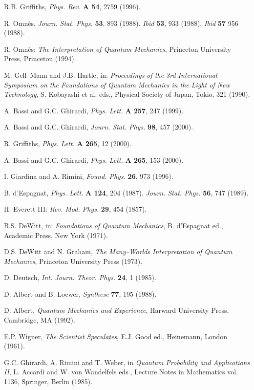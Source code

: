 \documentclass[12pt]{article}
\begin{document}
\begin{thebibliography}{999}
 R.B. Griffiths, {\it Phys. Rev.} {\bf A 54}, 2759
(1996).

 R. Omn\`es, {\it Journ. Stat. Phys.} {\bf 53}, 893
(1988). {\it Ibid} {\bf 53}, 933 (1988). {\it Ibid} {\bf 57} 956
(1988).

 R. Omn\`es: {\it The Interpretation of Quantum
Mechanics}, Princeton University Press, Princeton (1994).

 M. Gell--Mann and J.B. Hartle, in: {\it Proceedings
of the 3rd International Symposium on the Foundations of Quantum
Mechanics in the Light of New Technology}, S. Kobayashi et al.
eds., Physical Society of Japan, Tokio, 321 (1990).

 A. Bassi and G.C. Ghirardi, {\it Phys. Lett.} {\bf A
257}, 247 (1999).

 A. Bassi and G.C. Ghirardi, {\it Journ. Stat. Phys.}
{\bf 98}, 457 (2000).

 R. Griffiths, {\it Phys. Lett.} {\bf A 265}, 12
(2000).

 A. Bassi and G.C. Ghirardi, {\it Phys. Lett.} {\bf
A 265}, 153 (2000).

 I. Giardina and A. Rimini, {\it Found. Phys.}
{\bf 26}, 973 (1996).

 B. d'Espagnat, {\it Phys. Lett.} {\bf A 124}, 204
(1987). {\it Journ. Stat. Phys.} {\bf 56}, 747 (1989).

 H. Everett III: {\it Rev. Mod. Phys.} {\bf 29}, 454
(1857).

 B.S. DeWitt, in: {\it Foundations of Quantum
Mechanics}, B. d'Espagnat ed., Academic Press, New York (1971).

 D.S. DeWitt and N. Graham, {\it The Many--Worlds
Interpretation of Quantum Mechanics}, Princeton University Press
(1973).

 D. Deutsch, {\it Int. Journ. Theor. Phys.} {\bf 24},
1 (1985).

 D. Albert and B. Loewer, {\it Synthese} {\bf 77},
195 (1988).

 D. Albert, {\it Quantum Mechanics and Experience},
Harward University Press, Cambridge, MA (1992).

 E.P. Wigner, {\it The Scientist Speculates}, E.J.
Good ed., Heinemann, London (1961).

 G.C. Ghirardi, A. Rimini and T. Weber, in {\it Quantum
Probability and Applications II}, L. Accardi and W. von Wandelfels eds.,
Lecture Notes in Mathematics vol. 1136, Springer, Berlin (1985).


\end{thebibliography}
\end{document}
